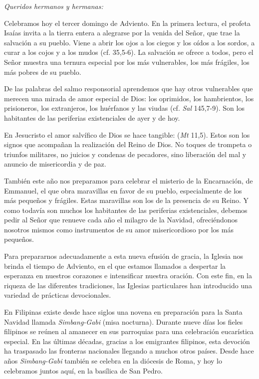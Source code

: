 				\begin{body}
					\emph{Queridos hermanos y hermanas:}
					
					Celebramos hoy el tercer domingo de Adviento. En la primera lectura, el profeta Isaías invita a la tierra entera a alegrarse por la venida del Señor, que trae la salvación a su pueblo. Viene a abrir los ojos a los ciegos y los oídos a los sordos, a curar a los cojos y a los mudos (cf. 35,5-6). La salvación se ofrece a todos, pero el Señor muestra una ternura especial por los más vulnerables, los más frágiles, los más pobres de su pueblo.
					
					De las palabras del salmo responsorial aprendemos que hay otros vulnerables que merecen una mirada de amor especial de Dios: los oprimidos, los hambrientos, los prisioneros, los extranjeros, los huérfanos y las viudas (cf. \emph{Sal} 145,7-9). Son los habitantes de las periferias existenciales de ayer y de hoy.
					
					En Jesucristo el amor salvífico de Dios se hace tangible:  (\emph{Mt} 11,5). Estos son los signos que acompañan la realización del Reino de Dios. No toques de trompeta o triunfos militares, no juicios y condenas de pecadores, sino liberación del mal y anuncio de misericordia y de paz.
					
					También este año nos preparamos para celebrar el misterio de la Encarnación, de Emmanuel, el  que obra maravillas en favor de su pueblo, especialmente de los más pequeños y frágiles. Estas maravillas son los  de la presencia de su Reino. Y como todavía son muchos los habitantes de las periferias existenciales, debemos pedir al Señor que renueve cada año el milagro de la Navidad, ofreciéndonos nosotros mismos como instrumentos de su amor misericordioso por los más pequeños.
					
					Para prepararnos adecuadamente a esta nueva efusión de gracia, la Iglesia nos brinda el tiempo de Adviento, en el que estamos llamados a despertar la esperanza en nuestros corazones e intensificar nuestra oración. Con este fin, en la riqueza de las diferentes tradiciones, las Iglesias particulares han introducido una variedad de prácticas devocionales.
					
					En Filipinas existe desde hace siglos una novena en preparación para la Santa Navidad llamada \emph{Simbang-Gabi} (misa nocturna). Durante nueve días los fieles filipinos se reúnen al amanecer en sus parroquias para una celebración eucarística especial. En las últimas décadas, gracias a los emigrantes filipinos, esta devoción ha traspasado las fronteras nacionales llegando a muchos otros países. Desde hace años \emph{Simbang-Gabi} también se celebra en la diócesis de Roma, y hoy lo celebramos juntos aquí, en la basílica de San Pedro.
					

\end{body}
